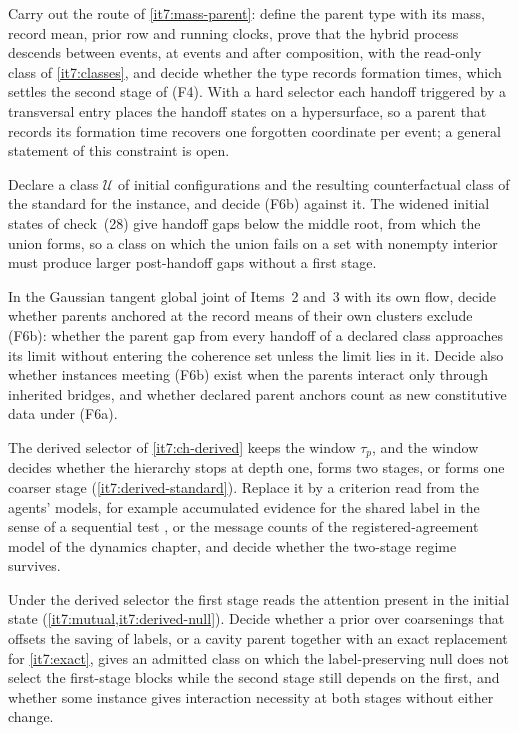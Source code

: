 \documentclass[11pt,letterpaper]{report}
\begin{document}
Carry out the route of \cref{it7:mass-parent}: define the parent type with its mass, record mean, prior row and running clocks, prove that the hybrid process descends between events, at events and after composition, with the read-only class of \cref{it7:classes}, and decide whether the type records formation times, which settles the second stage of (F4). With a hard selector each handoff triggered by a transversal entry places the handoff states on a hypersurface, so a parent that records its formation time recovers one forgotten coordinate per event; a general statement of this constraint is open.

Declare a class $\mathcal U$ of initial configurations and the resulting counterfactual class of the standard for the instance, and decide (F6b) against it. The widened initial states of check~(28) give handoff gaps below the middle root, from which the union forms, so a class on which the union fails on a set with nonempty interior must produce larger post-handoff gaps without a first stage.

In the Gaussian tangent global joint of Items~2 and~3 with its own flow, decide whether parents anchored at the record means of their own clusters exclude (F6b): whether the parent gap from every handoff of a declared class approaches its limit without entering the coherence set unless the limit lies in it. Decide also whether instances meeting (F6b) exist when the parents interact only through inherited bridges, and whether declared parent anchors count as new constitutive data under (F6a).

The derived selector of \cref{it7:ch-derived} keeps the window $\tau_p$, and the window decides whether the hierarchy stops at depth one, forms two stages, or forms one coarser stage (\cref{it7:derived-standard}). Replace it by a criterion read from the agents' models, for example accumulated evidence for the shared label in the sense of a sequential test \citep{Wald1945}, or the message counts of the registered-agreement model of the dynamics chapter, and decide whether the two-stage regime survives.

Under the derived selector the first stage reads the attention present in the initial state (\cref{it7:mutual,it7:derived-null}). Decide whether a prior over coarsenings that offsets the saving of labels, or a cavity parent together with an exact replacement for \cref{it7:exact}, gives an admitted class on which the label-preserving null does not select the first-stage blocks while the second stage still depends on the first, and whether some instance gives interaction necessity at both stages without either change.
\end{document}
